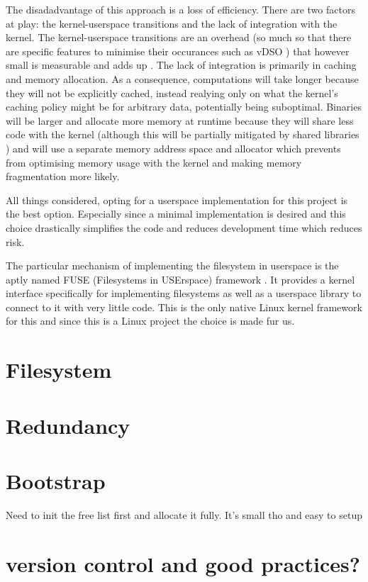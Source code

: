         The disadadvantage of this approach is a loss of efficiency. There are
        two factors at play: the kernel-userspace transitions and the lack of
        integration with the kernel. The kernel-userspace transitions are an
        overhead (so much so that there are specific features to minimise their
        occurances such as vDSO
        \cite{https://man7.org/linux/man-pages/man7/vdso.7.html}) that however
        small is measurable and adds up
        \cite{https://eli.thegreenplace.net/2018/measuring-context-switching-and-memory-overheads-for-linux-threads/}.
        The lack of integration is primarily in caching and memory allocation.
        As a consequence, computations will take longer because they will not
        be explicitly cached, instead realying only on what the kernel's
        caching policy might be for arbitrary data, potentially being
        suboptimal. Binaries will be larger and allocate more memory at runtime
        because they will share less code with the kernel (although this will
        be partially mitigated by shared libraries
        \cite{https://tldp.org/HOWTO/Program-Library-HOWTO/shared-libraries.html})
        and will use a separate memory address space and allocator which
        prevents from optimising memory usage with the kernel and making memory
        fragmentation more likely.

        All things considered, opting for a userspace implementation for this
        project is the best option. Especially since a minimal implementation
        is desired and this choice drastically simplifies the code and reduces
        development time which reduces risk.

        The particular mechanism of implementing the filesystem in userspace is
        the aptly named FUSE (Filesystems in USErspace) framework
        \cite{https://www.kernel.org/doc/html/latest/filesystems/fuse.html}. It
        provides a kernel interface specifically for implementing filesystems
        as well as a userspace library to connect to it with very little code.
        This is the only native Linux kernel framework for this and since this
        is a Linux project the choice is made fur us.

    \section{Filesystem}

    \section{Redundancy}

    \section{Bootstrap}

        Need to init the free list first and allocate it fully. It's small tho and easy to setup

    \section{version control and good practices?}

